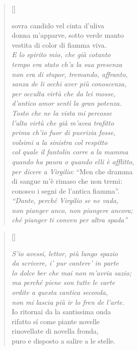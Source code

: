 \documentclass{article}
\begin{document}
\begin{verse}[\versewidth]
  \begin{patverse*}
    sovra candido vel cinta d'uliva\\
    donna m'apparve, sotto verde manto\\
    vestita di color di fiamma viva.\\
    \emph{E lo spirito mio, che già cotanto\\
    tempo era stato ch'a la sua presenza\\
    non era di stupor, tremando, affranto,\\
    sanza de li occhi aver più conoscenza,\\
    per occulta virtù che da lei mosse,\\
    d'antico amor sentì la gran potenza.\\
    Tosto che ne la vista mi percosse\\
    l'alta virtù che già m'avea trafitto\\
    prima ch'io fuor di puerizia fosse,\\
    volsimi a la sinistra col respitto\\
    col quale il fantolin corre a la mamma\\
    quando ha paura o quando elli è afflitto,\\
    per dicere a Virgilio}: ``Men che dramma\\
    di sangue m'è rimaso che non tremi:\\
    conosco i segni de l'antica fiamma''.\\[10pt]
    \emph{``Dante, perché Virgilio se ne vada,\\
    non pianger anco, non piangere ancora;\\
    ché pianger ti conven per altra spada''}
  \end{patverse*}
\end{verse}

\begin{verse}[\versewidth]
  \begin{patverse*}
    \emph{S'io avessi, lettor, più lungo spazio\\
    da scrivere, i' pur cantere' in parte\\
    lo dolce ber che mai non m'avria sazio;\\
    ma perché piene son tutte le carte\\
    ordite a questa cantica seconda,\\
    non mi lascia più ir lo fren de l'arte.}\\
    Io ritornai da la santissima onda\\
    rifatto sí come piante novelle\\
    rinovellate di novella fronda,\\
    puro e disposto a salire a le stelle.
  \end{patverse*}
\end{verse}
\end{document}
